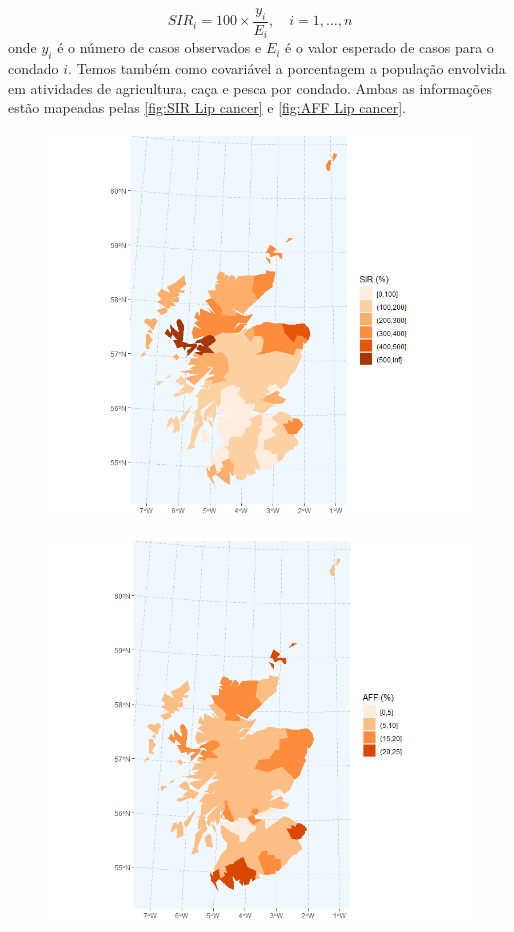 \begin{equation}
    \label{eq: SIR}
    SIR_i = 100 \times \frac{y_i}{E_i}, \quad i=1,\dots,n
\end{equation}
onde $y_i$ é o número de casos observados e $E_i$ é o valor esperado de casos para o condado $i$. Temos também como covariável a porcentagem a população envolvida em atividades de agricultura, caça e pesca por condado. Ambas as informações estão mapeadas pelas \autoref{fig:SIR Lip cancer} e \autoref{fig:AFF Lip cancer}.
\begin{figure}[b]
\centering
\begin{minipage}{.45\textwidth}
  \centering
  \includegraphics[width=\linewidth]{images/SIR_map_LIP.png}
  \label{fig:SIR Lip cancer}
\end{minipage}%
\begin{minipage}{.45\textwidth}
  \centering
  \includegraphics[width=\linewidth]{images/AFF_map_LIP.png}

\end{minipage}
\end{figure}
